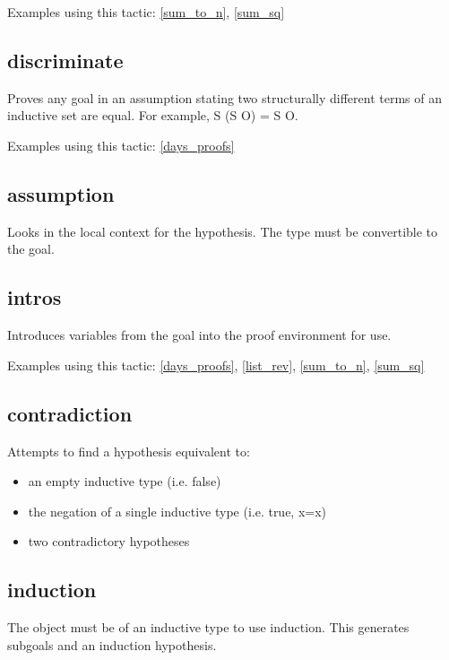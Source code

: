 \noindent
Examples using this tactic: 
\ref{sum_to_n}, \ref{sum_sq}




\subsection{discriminate} \label{discriminate}
Proves any goal in an assumption stating two structurally different terms of an inductive set are equal. For example, S (S O) = S O.

\noindent
Examples using this tactic: 
\ref{days_proofs}




\subsection{assumption} \label{assumption}
Looks in the local context for the hypothesis. The type must be convertible to the goal.





\subsection{intros} \label{intros}
Introduces variables from the goal into the proof environment for use.

\noindent
Examples using this tactic: 
\ref{days_proofs}, \ref{list_rev}, \ref{sum_to_n}, \ref{sum_sq}



%
\subsection{contradiction} \label{contradiction}
Attempts to find a hypothesis equivalent to:
\begin{itemize}
	\item an empty inductive type (i.e. false)
	\item the negation of a single inductive type (i.e. true, x=x)
	\item two contradictory hypotheses
\end{itemize}





\subsection{induction} \label{induction}
The object must be of an inductive type to use induction. 
This generates subgoals and an induction hypothesis.

